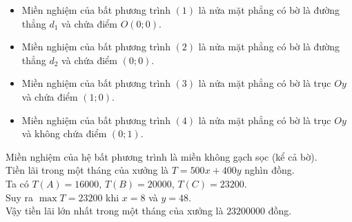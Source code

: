 \begin{bt}
{{}
				\noindent
				\begin{itemize}
					\item Miền nghiệm của bất phương trình $ (1) $ là nửa mặt phẳng có bờ là đường thẳng $ d_1 $ và chứa điểm $ O(0;0) $.
					\item Miền nghiệm của bất phương trình $ (2) $ là nửa mặt phẳng có bờ là đường thẳng $ d_2 $ và chứa điểm $ (0;0) $.
					\item Miền nghiệm của bất phương trình $ (3) $ là nửa mặt phẳng có bờ là trục $ Oy $ và chứa điểm $ (1;0) $.
					\item Miền nghiệm của bất phương trình $ (4) $ là nửa mặt phẳng có bờ là trục $ Oy $ và không chứa điểm $ (0;1) $.
				\end{itemize}
				Miền nghiệm của hệ bất phương trình là miền không gạch sọc (kể cả bờ).\\
				Tiền lãi trong một tháng của xưởng là $T=500x+400y$ nghìn đồng.\\
				Ta có $T(A)=16000$, $T(B)=20000$, $T(C)=23200$.\\
				Suy ra $\max T=23200$ khi $x=8$ và $y=48$.\\
				Vậy tiền lãi lớn nhất trong một tháng của xưởng là $23200000$ đồng.
			}
		\end{bt}

